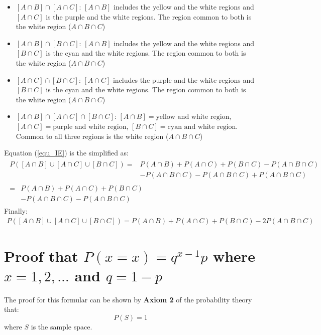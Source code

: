\documentclass[a4paper]{article}
\begin{document}
    \begin{itemize}
        \item $[A \cap B] \cap [A \cap C]$: $[A \cap B]$ includes the yellow and the white regions and $[A \cap C]$ is the purple and the white regions. The region common to both is the white region ($A \cap B \cap C$)
        \item $[A \cap B] \cap [B \cap C]$: $[A \cap B]$ includes the yellow and the white regions and $[B \cap C]$ is the cyan and the white regions. The region common to both is the white region ($A \cap B \cap C$)
        \item $[A \cap C] \cap [B \cap C]$: $[A \cap C]$ includes the purple and the white regions and $[B \cap C]$ is the cyan and the white regions. The region common to both is the white region ($A \cap B \cap C$)
        \item $[A \cap B] \cap [A \cap C] \cap [B \cap C]$: $[A \cap B] = \text{yellow and white region}$, $[A \cap C] = \text{purple and white region}$, $[B \cap C] = \text{cyan and white region}$. Common to all three regions is the white region ($A \cap B \cap C$)
    \end{itemize}
    Equation (\ref{equ_IE}) is the simplified as:
    \begin{align}
        \begin{split}
            P([A \cap B] \cup [A \cap C] \cup [B \cap C]) = & P(A \cap B) + P(A \cap C) + P(B \cap C) - P(A \cap B \cap C) \\
            & - P(A \cap B \cap C) - P(A \cap B \cap C) + P(A \cap B \cap C)
        \end{split} \\
        \begin{split}
            = & P(A \cap B) + P(A \cap C) + P(B \cap C) \\
            & - P(A \cap B \cap C) - P(A \cap B \cap C)
        \end{split}
    \end{align}
    Finally:
    \begin{align}
        P([A \cap B] \cup [A \cap C] \cup [B \cap C]) = P(A \cap B) + P(A \cap C) + P(B \cap C) - 2P(A \cap B \cap C)
    \end{align}

    \vspace{1cm}
    \section{Proof that $P(x=x) = q^{x-1}p$ where $x=1,2,\ldots$ and $q = 1-p$}
    The proof for this formular can be shown by \textbf{Axiom 2} of the probability theory that:
    \begin{equation}P(S) = 1\end{equation}
    where $S$ is the sample space.
\end{document}
